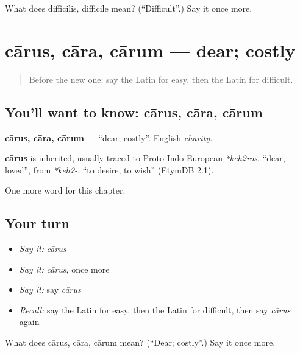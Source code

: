 \begin{tcolorbox}[breakable,colback=teal!4,colframe=teal!35!black,title={Before you move on}]
What does difficilis, difficile mean? (\textquotedblleft{}Difficult\textquotedblright{}.) Say it once more.
\end{tcolorbox}
\section[cārus, cāra, cārum]{cārus, cāra, cārum — dear; costly}

\label{lesson:LA-C97-carus}



\begin{quote}
Before the new one: say the Latin for easy, then the Latin for difficult.
\end{quote}

\subsection*{You'll want to know: cārus, cāra, cārum}
\textbf{cārus, cāra, cārum} — \textquotedblleft{}dear; costly\textquotedblright{}. English \emph{charity}.

\begin{cousinweb}
\textbf{cārus} is inherited, usually traced to Proto-Indo-European \emph{*keh2ros}, \textquotedblleft{}dear, loved\textquotedblright{}, from \emph{*keh2-}, \textquotedblleft{}to desire, to wish\textquotedblright{} (EtymDB 2.1).
\end{cousinweb}

\begin{grammarlens}[title={What you've built}]
One more word for this chapter.
\end{grammarlens}

\subsection*{Your turn}
\begin{itemize}
\raggedright
  \item \emph{Say it:} \emph{cārus}
  \item \emph{Say it:} \emph{cārus}, once more
  \item \emph{Say it:} say \emph{cārus}
  \item \emph{Recall:} say the Latin for easy, then the Latin for difficult, then say \emph{cārus} again
\end{itemize}

\begin{tcolorbox}[breakable,colback=teal!4,colframe=teal!35!black,title={Before you move on}]
What does cārus, cāra, cārum mean? (\textquotedblleft{}Dear; costly\textquotedblright{}.) Say it once more.
\end{tcolorbox}
